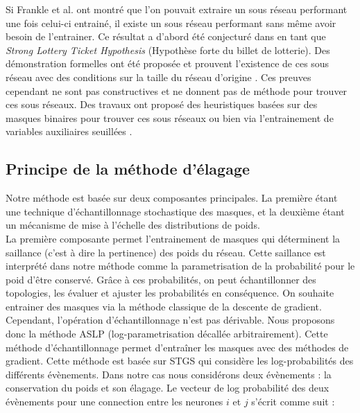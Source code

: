 Si Frankle et al. ont montré que l'on pouvait extraire un sous réseau performant
une fois celui-ci entrainé, il existe un sous réseau performant sans même avoir
besoin de l'entrainer. Ce résultat a d'abord été conjecturé dans
\cite{DBLP:conf/cvpr/RamanujanWKFR20} en tant que \emph{Strong Lottery Ticket
Hypothesis} (Hypothèse forte du billet de lotterie). Des démonstration formelles
ont été proposée et prouvent l'existence de ces sous réseau avec des conditions
sur la taille du réseau d'origine
\cite{DBLP:conf/icml/MalachYSS20,DBLP:conf/nips/OrseauHR20,DBLP:conf/nips/PensiaRNVP20}.
Ces preuves cependant ne sont pas constructives et ne donnent pas de méthode
pour trouver ces sous réseaux. Des travaux ont proposé des heuristiques basées
sur des masques binaires pour trouver ces sous réseaux
\cite{DBLP:conf/nips/ZhouLLY19} ou bien via l'entrainement de variables
auxiliaires seuillées \cite{DBLP:conf/cvpr/RamanujanWKFR20}.



\subsection*{Principe de la méthode d'élagage}

Notre méthode est basée sur deux composantes principales. La première étant une
technique d'échantillonnage stochastique des masques, et la deuxième étant un
mécanisme de mise à l'échelle des distributions de poids. \\

La première composante permet l'entrainement de masques qui déterminent la
saillance (c'est à dire la pertinence) des poids du réseau. Cette saillance est
interprété dans notre méthode comme la parametrisation de la probabilité pour le
poid d'être conservé. Grâce à ces probabilités, on peut échantillonner des
topologies, les évaluer et ajuster les probabilités en conséquence. On souhaite
entrainer des masques via la méthode classique de la descente de gradient.
Cependant, l'opération d'échantillonnage n'est pas dérivable. Nous proposons
donc la méthode \ac{ASLP} (log-parametrisation décallée arbitrairement). Cette
méthode d'échantillonnage permet d'entraîner les masques avec des méthodes de
gradient. Cette méthode est basée sur \ac{STGS} qui considère les
log-probabilités des différents évènements. Dans notre cas nous considérons deux
évènements : la conservation du poids et son élagage. Le vecteur de log
probabilité des deux évènements pour une connection entre les neurones $i$ et
$j$ s'écrit comme suit :

